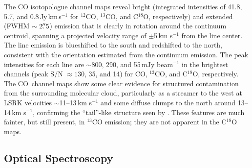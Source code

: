 \documentclass[twocolumn]{aastex61}
\newcommand{\twelve}{CO}
\newcommand{\thirteen}{${}^{13}$CO}
\newcommand{\eighteen}{C${}^{18}$O}
\begin{document}
The CO isotopologue channel maps reveal bright (integrated intensities of 41.8, 5.7, and 0.8\,Jy\,km\,s$^{-1}$ for $^{12}$CO, $^{13}$CO, and C$^{18}$O, respectively) and extended (FWHM $\sim 2\mbox{$.\!\!^{\prime\prime}$}5$) emission that is clearly in rotation around the continuum centroid, spanning a projected velocity range of $\pm$5\,km s$^{-1}$ from the line center.  The line emission is blueshifted to the south and redshifted to the north, consistent with the orientation estimated from the continuum emission.
The peak intensities for each line are $\sim$800, 290, and 55\,mJy beam$^{-1}$ in the brightest channels (peak S/N $\approx 130$, 35, and 14) for \twelve, \thirteen, and \eighteen, respectively. The \twelve\ channel maps show some clear evidence for structured contamination from the surrounding molecular cloud, particularly as a streamer to the west at LSRK velocities $\sim$11--13\,km s$^{-1}$ and some diffuse clumps to the north around 13--14\,km s$^{-1}$, confirming the ``tail''-like structure seen by \citet{fang17}.  These features are much fainter, but still present, in $^{13}$CO emission; they are not apparent in the C$^{18}$O maps.

\subsection{Optical Spectroscopy \label{subsec:spectroscopy}}
\end{document}
